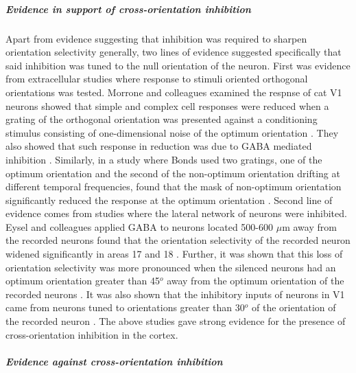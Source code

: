 \subparagraph{Evidence in support of cross-orientation inhibition}

Apart from evidence suggesting that inhibition was required to sharpen orientation selectivity generally, two lines of evidence suggested specifically that said inhibition was tuned to the null orientation of the neuron. First was evidence from extracellular studies where response to stimuli oriented orthogonal orientations was tested. Morrone and colleagues examined the respnse of cat V1 neurons showed that simple and complex cell responses were reduced when a grating of the orthogonal orientation was presented against a conditioning stimulus consisting of one-dimensional noise of the optimum orientation \cite{Morrone1982}. They also showed that such response in reduction was due to GABA mediated inhibition \cite{Morrone1987}. Similarly, in a study where Bonds used two gratings, one of the optimum orientation and the second of the non-optimum orientation drifting at different temporal frequencies, found that the mask of non-optimum orientation significantly reduced the response at the optimum orientation \cite{Bonds1989}. Second line of evidence comes from studies where the lateral network of neurons were inhibited. Eysel and colleagues applied GABA to neurons located 500-600 $\mu$m away from the recorded neurons found that the orientation selectivity of the recorded neuron widened significantly in areas 17 and 18 \cite{Worgotter1988, Eysel1990, Crook1992}. Further, it was shown that this loss of orientation selectivity was more pronounced when the silenced neurons had an optimum orientation greater than 45$^o$ away from the optimum orientation of the recorded neurons \cite{Crook1992, Crook1997}. It was also shown that the inhibitory inputs of neurons in V1 came from neurons tuned to orientations greater than 30$^o$ of the orientation of the recorded neuron \cite{Kisvarday1997}. The above studies gave strong evidence for the presence of cross-orientation inhibition in the cortex.

\subparagraph{Evidence against cross-orientation inhibition}

